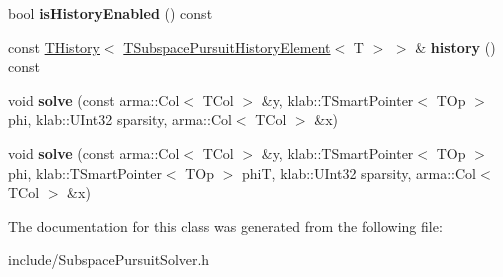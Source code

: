 \begin{DoxyCompactItemize}
\item 
bool {\bfseries is\+History\+Enabled} () const \hypertarget{classkl1p_1_1TSubspacePursuitSolver_a51d87f330b8039f2bb6def5196bec895}{}\label{classkl1p_1_1TSubspacePursuitSolver_a51d87f330b8039f2bb6def5196bec895}

\item 
const \hyperlink{classkl1p_1_1THistory}{T\+History}$<$ \hyperlink{classkl1p_1_1TSubspacePursuitHistoryElement}{T\+Subspace\+Pursuit\+History\+Element}$<$ T $>$ $>$ \& {\bfseries history} () const \hypertarget{classkl1p_1_1TSubspacePursuitSolver_ab2b7eaf5b97a6668f6c3e03bbdb57081}{}\label{classkl1p_1_1TSubspacePursuitSolver_ab2b7eaf5b97a6668f6c3e03bbdb57081}

\item 
void {\bfseries solve} (const arma\+::\+Col$<$ T\+Col $>$ \&y, klab\+::\+T\+Smart\+Pointer$<$ T\+Op $>$ phi, klab\+::\+U\+Int32 sparsity, arma\+::\+Col$<$ T\+Col $>$ \&x)\hypertarget{classkl1p_1_1TSubspacePursuitSolver_a49c5936e75a6222b4cea143f0ed0424c}{}\label{classkl1p_1_1TSubspacePursuitSolver_a49c5936e75a6222b4cea143f0ed0424c}

\item 
void {\bfseries solve} (const arma\+::\+Col$<$ T\+Col $>$ \&y, klab\+::\+T\+Smart\+Pointer$<$ T\+Op $>$ phi, klab\+::\+T\+Smart\+Pointer$<$ T\+Op $>$ phiT, klab\+::\+U\+Int32 sparsity, arma\+::\+Col$<$ T\+Col $>$ \&x)\hypertarget{classkl1p_1_1TSubspacePursuitSolver_a72533ffc21d900d9b8c02f601e80a50d}{}\label{classkl1p_1_1TSubspacePursuitSolver_a72533ffc21d900d9b8c02f601e80a50d}

\end{DoxyCompactItemize}


The documentation for this class was generated from the following file\+:\begin{DoxyCompactItemize}
\item 
include/Subspace\+Pursuit\+Solver.\+h\end{DoxyCompactItemize}
